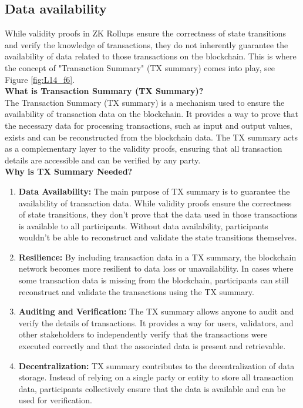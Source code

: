 \subsection{Data availability}
While validity proofs in ZK Rollups ensure the correctness of state transitions and verify the knowledge of transactions, they do not inherently guarantee the availability of data related to those transactions on the blockchain. This is where the concept of "Transaction Summary" (TX summary) comes into play, see Figure \ref{fig:L14_f6}.\\
\textbf{What is Transaction Summary (TX Summary)?}\\
The Transaction Summary (TX summary) is a mechanism used to ensure the availability of transaction data on the blockchain. It provides a way to prove that the necessary data for processing transactions, such as input and output values, exists and can be reconstructed from the blockchain data. The TX summary acts as a complementary layer to the validity proofs, ensuring that all transaction details are accessible and can be verified by any party.\\
\textbf{Why is TX Summary Needed?}
\begin{enumerate}
	\item \textbf{Data Availability:}  The main purpose of TX summary is to guarantee the availability of transaction data. While validity proofs ensure the correctness of state transitions, they don't prove that the data used in those transactions is available to all participants. Without data availability, participants wouldn't be able to reconstruct and validate the state transitions themselves.
	\item \textbf{Resilience:} By including transaction data in a TX summary, the blockchain network becomes more resilient to data loss or unavailability. In cases where some transaction data is missing from the blockchain, participants can still reconstruct and validate the transactions using the TX summary.
	\item \textbf{Auditing and Verification:} The TX summary allows anyone to audit and verify the details of transactions. It provides a way for users, validators, and other stakeholders to independently verify that the transactions were executed correctly and that the associated data is present and retrievable.
	\item \textbf{Decentralization:} TX summary contributes to the decentralization of data storage. Instead of relying on a single party or entity to store all transaction data, participants collectively ensure that the data is available and can be used for verification.
\end{enumerate}

